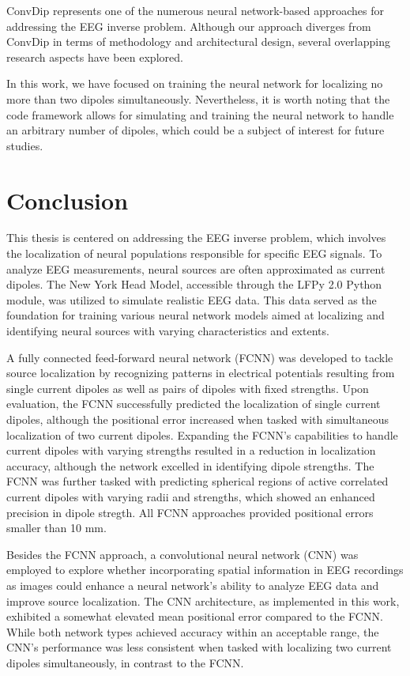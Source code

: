 \documentclass[a4paper, UKenglish, 11pt]{uiomaster}
\begin{document}
ConvDip represents one of the numerous neural network-based approaches for addressing the EEG inverse problem. Although our approach diverges from ConvDip in terms of methodology and architectural design, several overlapping research aspects have been explored.

In this work, we have focused on training the neural network for localizing no more than two dipoles simultaneously. Nevertheless, it is worth noting that the code framework allows for simulating and training the neural network to handle an arbitrary number of dipoles, which could be a subject of interest for future studies.

\section{Conclusion} \label{sec:Conclusion}
This thesis is centered on addressing the EEG inverse problem, which involves the localization of neural populations responsible for specific EEG signals. To analyze EEG measurements, neural sources are often approximated as current dipoles. The New York Head Model, accessible through the LFPy 2.0 Python module, was utilized to simulate realistic EEG data. This data served as the foundation for training various neural network models aimed at localizing and identifying neural sources with varying characteristics and extents.

A fully connected feed-forward neural network (FCNN) was developed to tackle source localization by recognizing patterns in electrical potentials resulting from single current dipoles as well as pairs of dipoles with fixed strengths. Upon evaluation, the FCNN successfully predicted the localization of single current dipoles, although the positional error increased when tasked with simultaneous localization of two current dipoles. Expanding the FCNN's capabilities to handle current dipoles with varying strengths resulted in a reduction in localization accuracy, although the network excelled in identifying dipole strengths. The FCNN was further tasked with predicting spherical regions of active correlated current dipoles with varying radii and strengths, which showed an enhanced precision in dipole stregth. All FCNN approaches provided positional errors smaller than 10 mm.

Besides the FCNN approach, a convolutional neural network (CNN) was employed to explore whether incorporating spatial information in EEG recordings as images could enhance a neural network's ability to analyze EEG data and improve source localization. The CNN architecture, as implemented in this work, exhibited a somewhat elevated mean positional error compared to the FCNN. While both network types achieved accuracy within an acceptable range, the CNN's performance was less consistent when tasked with localizing two current dipoles simultaneously, in contrast to the FCNN.
\end{document}
